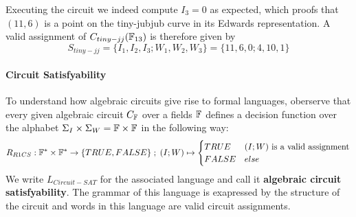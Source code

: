 \begin{example}
\begin{comment}
\begingroup
    \fontsize{8pt}{10pt}\selectfont
\[
\xymatrix{
 & &  & &
x\ar^{I_1=11}@/^/[d]\ar_{I_1=11}@/_/[d]  &  & & 
y\ar^{I_2=6}@/^/[d]\ar_{I_3=6}@/_/[d]\\
 & 10 \ar[dr]& & &
\cdot \ar^{W_1=4}[drr] \ar_{W_1=4}[dll]&  & &
\cdot \ar_{W_2=10}[dl] \ar^{W_2=10}[ddr] &  &
12 \ar[ddl] \\
1 \ar[dr] & &  
 \cdot \ar^{[10\cdot 4 = 1]}[dl] & & 
 8 \ar[dr] & &
 \cdot \ar_{W_3=1}[dl] & & 
 \\
 & 
 + \ar^{[1+1=2]}[drr] & & & &
 \cdot \ar^{[8\cdot 1 = 1]}[dll] & & &
 \cdot \ar^{[10\cdot 12=3]}[ddlll]\\
 & & & 
 + \ar^{[2+8=10]}[drr]& & & 
 \\
 & & & & & 
 + \ar_{I_3=0}[d]\\
 & & & & & 
 f_{tiny-jj}(x,y)
}
\]
\endgroup
\end{comment}
Executing the circuit we indeed compute $I_3=0$ as expected, which proofs that $(11,6)$ is a point on the tiny-jubjub curve in its Edwards representation. A valid assignment of $C_{tiny-jj}(\mathbb{F}_{13})$ is therefore given by 
$$
S_{tiny-jj} = \{I_1, I_2, I_3; W_1, W_2, W_3\} = \{11, 6, 0; 4, 10, 1\}
$$
\end{example}

\paragraph{Circuit Satisfyability} To understand how algebraic circuits give rise to formal languages, oberserve that every given algebraic circuit $C_{\mathbb{F}}$ over a fields $\mathbb{F}$ defines a decision function over the alphabet $\Sigma_I \times \Sigma_W = \mathbb{F} \times \mathbb{F}$ in the following way:
\begin{equation}
R_{R1CS} : \mathbb{F}^* \times \mathbb{F}^* \to \{TRUE, FALSE\}\;;\;
(I;W) \mapsto
\begin{cases}
TRUE & (I;W) \text{ is a valid assignment}\\
FALSE & else
\end{cases}
\end{equation}
We write $L_{Circuit-SAT}$ for the associated language and call it \textbf{algebraic circuit satisfyability}. The grammar of this language is exapressed by the structure of the circuit and words in this language are valid circuit assignments. 

